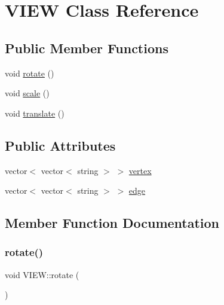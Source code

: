 \hypertarget{class_v_i_e_w}{}\section{V\+I\+EW Class Reference}
\label{class_v_i_e_w}
\subsection*{Public Member Functions}
\begin{DoxyCompactItemize}
\item 
void \mbox{\hyperlink{class_v_i_e_w_a8fe1f7ac6dd6c11dac46a92d2d5b56d4}{rotate}} ()
\item 
void \mbox{\hyperlink{class_v_i_e_w_ad2d296c3854cbd031a07bdc9042ab81d}{scale}} ()
\item 
void \mbox{\hyperlink{class_v_i_e_w_a8eb72bffa6e630328a51710f5ce84f9b}{translate}} ()
\end{DoxyCompactItemize}
\subsection*{Public Attributes}
\begin{DoxyCompactItemize}
\item 
vector$<$ vector$<$ string $>$ $>$ \mbox{\hyperlink{class_v_i_e_w_a59a37316ac1fea0dab37868f737b9ff6}{vertex}}
\item 
vector$<$ vector$<$ string $>$ $>$ \mbox{\hyperlink{class_v_i_e_w_a1f0a3791f9244133bb2013de43559111}{edge}}
\end{DoxyCompactItemize}


\subsection{Member Function Documentation}
\mbox{\label{class_v_i_e_w_a8fe1f7ac6dd6c11dac46a92d2d5b56d4}} 
\subsubsection{\texorpdfstring{rotate()}{rotate()}}
{\footnotesize\ttfamily void V\+I\+E\+W\+::rotate (\begin{DoxyParamCaption}{ }\end{DoxyParamCaption})\hspace{0.3cm}{\ttfamily [inline]}}

\mbox{\label{class_v_i_e_w_ad2d296c3854cbd031a07bdc9042ab81d}} 
